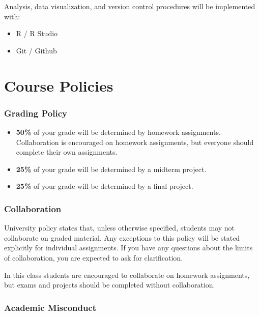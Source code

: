 \documentclass[11pt,]{article}
\providecommand{\tightlist}{%
  \setlength{\itemsep}{0pt}\setlength{\parskip}{0pt}}
\begin{document}
Analysis, data visualization, and version control procedures will be
implemented with:

\begin{itemize}
\tightlist
\item
  R / R Studio
\item
  Git / Github
\end{itemize}

\hypertarget{course-policies}{%
\section{Course Policies}\label{course-policies}}

\hypertarget{grading-policy}{%
\subsubsection{Grading Policy}\label{grading-policy}}

\begin{itemize}
\item
  \textbf{50\%} of your grade will be determined by homework
  assignments. Collaboration is encouraged on homework assignments, but
  everyone should complete their own assignments.
\item
  \textbf{25\%} of your grade will be determined by a midterm project.
\item
  \textbf{25\%} of your grade will be determined by a final project.
\end{itemize}

\hypertarget{collaboration}{%
\subsubsection{Collaboration}\label{collaboration}}

University policy states that, unless otherwise specified, students may
not collaborate on graded material. Any exceptions to this policy will
be stated explicitly for individual assignments. If you have any
questions about the limits of collaboration, you are expected to ask for
clarification.

In this class students are encouraged to collaborate on homework
assignments, but exams and projects should be completed without
collaboration.

\hypertarget{academic-misconduct}{%
\subsubsection{Academic Misconduct}\label{academic-misconduct}}
\end{document}

